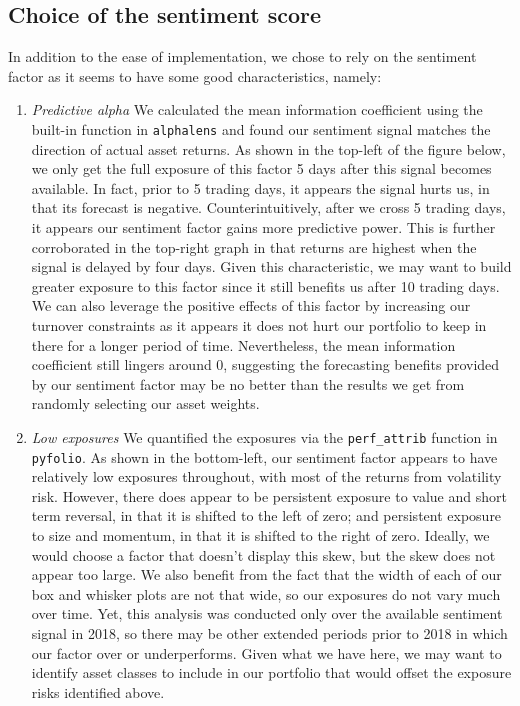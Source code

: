 \documentclass[11pt,]{article}
\begin{document}
\subsection{Choice of the sentiment
score}\label{choice-of-the-sentiment-score}

In addition to the ease of implementation, we chose to rely on the
sentiment factor as it seems to have some good characteristics, namely:

\begin{enumerate}
\def\labelenumi{\arabic{enumi}.}
\item
  \emph{Predictive alpha} We calculated the mean information coefficient
  using the built-in function in \texttt{alphalens} and found our
  sentiment signal matches the direction of actual asset returns. As
  shown in the top-left of the figure below, we only get the full
  exposure of this factor 5 days after this signal becomes available. In
  fact, prior to 5 trading days, it appears the signal hurts us, in that
  its forecast is negative. Counterintuitively, after we cross 5 trading
  days, it appears our sentiment factor gains more predictive power.
  This is further corroborated in the top-right graph in that returns
  are highest when the signal is delayed by four days. Given this
  characteristic, we may want to build greater exposure to this factor
  since it still benefits us after 10 trading days. We can also leverage
  the positive effects of this factor by increasing our turnover
  constraints as it appears it does not hurt our portfolio to keep in
  there for a longer period of time. Nevertheless, the mean information
  coefficient still lingers around 0, suggesting the forecasting
  benefits provided by our sentiment factor may be no better than the
  results we get from randomly selecting our asset weights.
\item
  \emph{Low exposures} We quantified the exposures via the
  \texttt{perf\_attrib} function in \texttt{pyfolio}. As shown in the
  bottom-left, our sentiment factor appears to have relatively low
  exposures throughout, with most of the returns from volatility risk.
  However, there does appear to be persistent exposure to value and
  short term reversal, in that it is shifted to the left of zero; and
  persistent exposure to size and momentum, in that it is shifted to the
  right of zero. Ideally, we would choose a factor that doesn't display
  this skew, but the skew does not appear too large. We also benefit
  from the fact that the width of each of our box and whisker plots are
  not that wide, so our exposures do not vary much over time. Yet, this
  analysis was conducted only over the available sentiment signal in
  2018, so there may be other extended periods prior to 2018 in which
  our factor over or underperforms. Given what we have here, we may want
  to identify asset classes to include in our portfolio that would
  offset the exposure risks identified above.
\end{enumerate}
\end{document}
